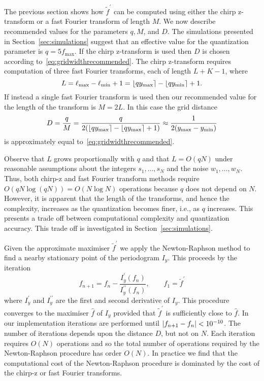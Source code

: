 \documentclass[10pt,twocolumn,twoside]{IEEEtran}
\begin{document}
The previous section shows how $\widetilde{f}^\prime$ can be computed using either the chirp z-transform or a fast Fourier transform of length $M$.  We now describe recommended values for the parameters $q, M$, and $D$.  The simulations presented in Section~\ref{sec:simulations} suggest that an effective value for the quantization parameter is $q = 5 f_{\text{max}}$.  If the chirp z-transform is used then $D$ is chosen according to~\eqref{eq:gridwidthrecommended}.  The chirp z-transform requires computation of three fast Fourier transforms, each of length $L + K - 1$, where 
\[
L = \ell_{\text{max}} - \ell_{\text{min}} + 1 = {\left\lfloor qy_{\text{max}} \right\rceil} - {\left\lfloor qy_{\text{min}} \right\rceil} + 1.
\]
If instead a single fast Fourier transform is used then our recommended value for the length of the transform is $M= 2L$.  In this case the grid distance
\[ 
D = \frac{q}{M} = \frac{q}{2({\left\lfloor qy_{\text{max}} \right\rceil} - {\left\lfloor qy_{\text{max}} \right\rceil} + 1)} \approx  \frac{1}{2(y_{\text{max}} - y_{\text{min}})}
\]
is approximately equal to~\eqref{eq:gridwidthrecommended}.  

Observe that $L$ grows proportionally with $q$ and that $L = O(qN)$ under reasonable assumptions about the integers $s_1,\dots,s_N$ and the noise $w_1,\dots,w_N$.  %
Thus, both chirp-z and fast Fourier transform methods require $O(qN\log(qN)) = O(N\log N)$ operations because $q$ does not depend on $N$.  However, it is apparent that the length of the transforms, and hence the complexity, increases as the quantization becomes finer, i.e., as $q$ increases.  This presents a trade off between computational complexity and quantization accuracy.  This trade off is investigated in Section~\ref{sec:simulations}.

Given the approximate maximiser $\widetilde{f}^\prime$ we apply the Newton-Raphson method to find a nearby stationary point of the periodogram $I_y$.  This proceeds by the iteration
\[
f_{n+1} = f_{n} - \frac{I_y^\prime(f_n)}{I_y^{\prime\prime}(f_n)}, \qquad f_{1} = \widetilde{f}^\prime
\]
where $I_y^\prime$ and $I_y^{\prime\prime}$ are the first and second derivative of $I_y$. This procedure converges to the maximiser $\hat{f}$ of $I_y$ provided that $\widetilde{f}^\prime$ is sufficiently close to $\hat{f}$.  In our implementation iterations are performed until $\vert f_{n+1}-f_n \vert < 10^{-10}$.  The number of iterations depends upon the distance $D$, but not on $N$.  Each iteration requires $O(N)$ operations and so the total number of operations required by the Newton-Raphson procedure has order $O(N)$.  In practice we find that the computational cost of the Newton-Raphson procedure is dominated by the cost of the chirp-z or fast Fourier transforms. 
\end{document}
